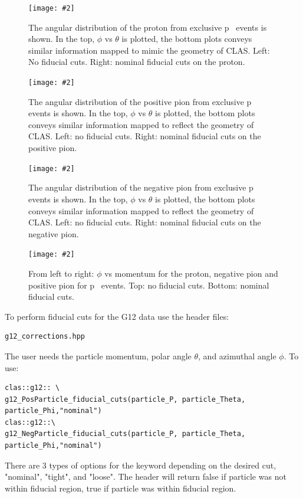 \newcommand{\onefig}[3]{
\begin{figure}
    \centering
    \texttt{[image: \#2]}
    \caption{#3}
    \label{#2}
    \end{figure}
}


\onefig{0.6}{figures/fiducial/fid2}{The angular distribution of the proton from exclusive \mbox{p \π[+] \π[-]} events is shown.  In the top, $\phi$ vs $\theta$ is plotted, the bottom plots conveys similar information mapped to mimic the geometry of CLAS. Left: No fiducial cuts. Right: nominal fiducial cuts on the proton.}
\onefig{0.6}{figures/fiducial/fid3}{The angular distribution of the positive pion from exclusive \mbox{p \π[+] \π[-]} events is shown.  In the top, $\phi$ vs $\theta$ is plotted, the bottom plots conveys similar information mapped to reflect the geometry of CLAS. Left: no fiducial cuts. Right: nominal fiducial cuts on the positive pion.}
\onefig{0.6}{figures/fiducial/fid4}{The angular distribution of the negative pion from exclusive \mbox{p \π[+] \π[-]} events is shown.  In the top, $\phi$ vs $\theta$ is plotted, the bottom plots conveys similar information mapped to reflect the geometry of CLAS. Left: no fiducial cuts. Right: nominal fiducial cuts on the negative pion.}
\onefig{0.7}{figures/fiducial/fid5}{From left to right: $\phi$ vs momentum for the proton, negative pion and positive pion for \mbox{p \π[+] \π[-]} events. Top: no fiducial cuts. Bottom: nominal fiducial cuts.}
\newpage
To perform fiducial cuts for the G12 data use the header files:
\begin{verbatim}
g12_corrections.hpp
\end{verbatim}
The user needs the particle momentum, polar angle $\theta$, and azimuthal angle $\phi$. To use:
\begin{verbatim}
clas::g12:: \
g12_PosParticle_fiducial_cuts(particle_P, particle_Theta, particle_Phi,"nominal")
clas::g12::\
g12_NegParticle_fiducial_cuts(particle_P, particle_Theta, particle_Phi,"nominal")
\end{verbatim}
There are 3 types of options for the keyword depending on the desired cut, "nominal", "tight", and "loose". The header will return false if particle was not within fiducial region, true if particle was within fiducial region.

